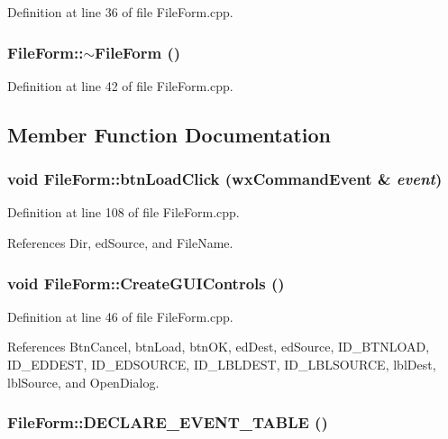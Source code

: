 Definition at line 36 of file File\-Form.cpp.
\subsubsection{\setlength{\rightskip}{0pt plus 5cm}File\-Form::$\sim$File\-Form ()\hspace{0.3cm}{\tt  [virtual]}}\label{class_file_form_044a3f6185357a729a4be2fbb88a5be5}




Definition at line 42 of file File\-Form.cpp.

\subsection{Member Function Documentation}
\subsubsection{\setlength{\rightskip}{0pt plus 5cm}void File\-Form::btn\-Load\-Click (wx\-Command\-Event \& {\em event})}\label{class_file_form_8ef48c68abc1c424ead3b1d62d8817c7}




Definition at line 108 of file File\-Form.cpp.

References Dir, ed\-Source, and File\-Name.
\subsubsection{\setlength{\rightskip}{0pt plus 5cm}void File\-Form::Create\-GUIControls ()\hspace{0.3cm}{\tt  [private]}}\label{class_file_form_3bd48ee62906efbdc9406c910fbd6ddd}




Definition at line 46 of file File\-Form.cpp.

References Btn\-Cancel, btn\-Load, btn\-OK, ed\-Dest, ed\-Source, ID\_\-BTNLOAD, ID\_\-EDDEST, ID\_\-EDSOURCE, ID\_\-LBLDEST, ID\_\-LBLSOURCE, lbl\-Dest, lbl\-Source, and Open\-Dialog.
\subsubsection{\setlength{\rightskip}{0pt plus 5cm}File\-Form::DECLARE\_\-EVENT\_\-TABLE ()\hspace{0.3cm}{\tt  [private]}}\label{class_file_form_1b58a4a14ee0f9db96c04b7516e53295}



